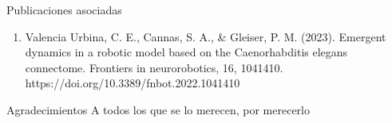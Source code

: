 \documentclass[12pt,screen,twoside,pagebackref]{ibtesis}
\begin{document}
\appendix




\begin{biblio}

\end{biblio}


\begin{postliminary}

\begin{seccion}{Publicaciones asociadas}
  \begin{enumerate}
  \item    Valencia Urbina, C. E., Cannas, S. A., \& Gleiser, P. M. (2023). Emergent dynamics in a robotic model based on the Caenorhabditis elegans connectome. Frontiers in neurorobotics, 16, 1041410. https://doi.org/10.3389/fnbot.2022.1041410
  
  \end{enumerate}
\end{seccion}

\begin{seccion}{Agradecimientos}
A todos los que se lo merecen, por merecerlo
\end{seccion}

\end{postliminary}
\end{document}
